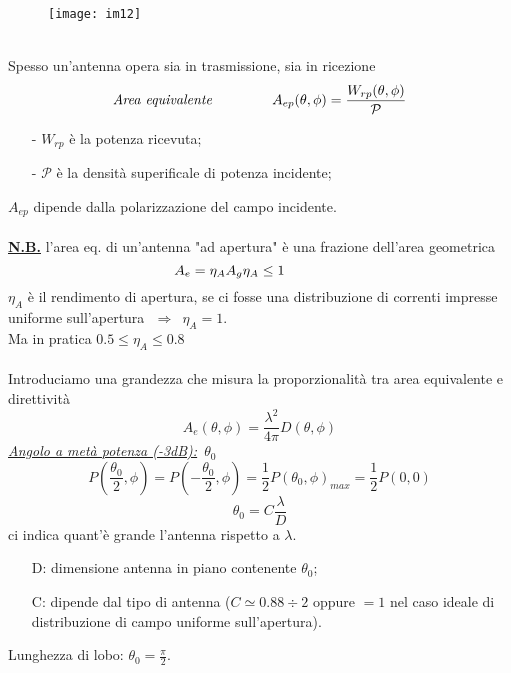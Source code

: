 \documentclass[a4paper]{article}
\begin{document}
\begin{figure}[ht] 
\centering
\texttt{[image: im12]}
\end{figure}
\\Spesso un'antenna opera sia in trasmissione, sia in ricezione
\begin{equation*}
\text{\emph{Area equivalente}}\hspace{15mm}A_{ep}(\theta,\phi)=\frac{W_{rp}(\theta,\phi)}{\mathcal{P}}
\end{equation*}
\begin{itemize}
\item[-] $W_{rp}$ è la potenza ricevuta;
\item[-] $\mathcal{P}$ è la densità superificale di potenza incidente;
\end{itemize}
$A_{ep}$ dipende dalla polarizzazione del campo incidente.\\\\
\underline{\textbf{N.B.}} l'area eq. di un'antenna "ad apertura" è una frazione dell'area geometrica
\begin{equation*}
A_e=\eta_AA_g\hspace{15mm\eta_A\leq1}
\end{equation*}
$\eta_A$ è il rendimento di apertura, se ci fosse una distribuzione di correnti impresse uniforme sull’apertura $\,\,\Rightarrow\,\,\,\eta_A=1$.\\
Ma in pratica $0.5\leq\eta_A\leq0.8$\\\\
Introduciamo una grandezza che misura la proporzionalità tra area equivalente e direttività
\begin{equation*}
A_{e}(\theta,\phi)=\frac{\lambda^2}{4\pi}D(\theta,\phi)
\end{equation*}
\underline{\emph{Angolo a metà potenza (-3dB):}} $\,\theta_0$
\begin{equation*}
P(\frac{\theta_0}{2},\phi)=P(-\frac{\theta_0}{2},\phi)=\frac{1}{2}P(\theta_0,\phi)_{max}=\frac{1}{2}P(0,0)
\end{equation*}
\begin{equation*}
\theta_0=C\frac{\lambda}{D}
\end{equation*}
\hspace*{4mm}ci indica quant'è grande l'antenna rispetto a $\lambda$.
\begin{itemize}
\item[D:] dimensione antenna in piano contenente $\theta_0$;
\item[C:] dipende dal tipo di antenna ($C\simeq0.88\div2$ oppure $=1$ nel caso ideale di distribuzione di campo uniforme sull’apertura).
\end{itemize}
Lunghezza di lobo: $\theta_0 = \frac{\pi}{2}$.
\end{document}
